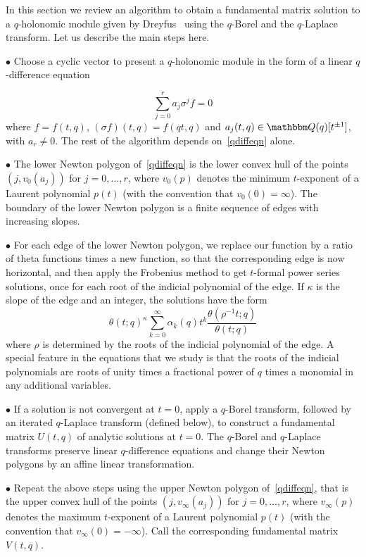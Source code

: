 \documentclass[12pt,reqno]{amsart}
\theoremstyle{definition}
\def\BQ{\mathbbm Q}
\def\s{\sigma}
\def\be{\begin{equation}}
\def\ee{\end{equation}}
\def\rind{\rho}
\begin{document}
In this section we review an algorithm to obtain a fundamental matrix solution
to a $q$-holonomic module given by Dreyfus~\cite{Dreyfus:building} using the
$q$-Borel and the $q$-Laplace transform. Let us describe the main steps here.

\noindent $\bullet$
Choose a cyclic vector to present a $q$-holonomic module in the form of a linear
$q$-difference equation

\be
\label{qdiffeqn}
\sum_{j=0}^r a_j \s^j f =0
\ee
where $f=f(t,q)$, $(\s f)(t,q)=f(qt,q)$ and $a_j(t,q) \in \BQ(q)[t^{\pm 1}]$,
with $a_r \neq 0$. The rest of the algorithm depends on~\eqref{qdiffeqn} alone.

\noindent $\bullet$
The lower Newton polygon of~\eqref{qdiffeqn} is the lower convex hull
of the points $(j, v_0(a_j))$ for $j=0,\dots,r$, where $v_0(p)$ denotes the
minimum $t$-exponent of a Laurent polynomial $p(t)$ (with the convention that
$v_0(0)=\infty$). The boundary of the lower Newton
polygon is a finite sequence of edges with increasing slopes. 

\noindent $\bullet$
For each edge of the lower Newton polygon, we replace our function by a ratio
of theta functions times a new function, so that the corresponding edge is now
horizontal, and then apply the Frobenius method to get $t$-formal power
series solutions, once for each root of the indicial polynomial of the edge.
If $\kappa$ is the slope of the edge and an integer, the solutions have the form
\be
\theta(t;q)^{\kappa}
\sum_{k=0}^{\infty}\alpha_{k}(q)t^{k}\frac{\theta(\rind^{-1}t;q)}{\theta(t;q)}
\ee
where $\rind$ is determined by the roots of the indicial polynomial of the edge.
A special feature in the equations that we study is that the roots of the indicial
polynomials are roots of unity times a fractional power of $q$ times a monomial
in any additional variables.

\noindent $\bullet$
If a solution is not convergent at $t=0$, apply a $q$-Borel transform, followed by
an iterated $q$-Laplace transform (defined below), to construct a fundamental matrix
$U(t,q)$ of analytic solutions at $t=0$.
The $q$-Borel and $q$-Laplace transforms preserve linear $q$-difference equations
and change their Newton polygons by an affine linear transformation.

\noindent $\bullet$
Repeat the above steps using the upper Newton polygon of~\eqref{qdiffeqn}, that
is the upper convex hull of the points $(j, v_\infty(a_j))$ for $j=0,\dots,r$,
where $v_\infty(p)$ denotes the maximum $t$-exponent of a Laurent polynomial $p(t)$
(with the convention that $v_\infty(0)=-\infty$). Call the corresponding fundamental
matrix $V(t,q)$.
\end{document}
